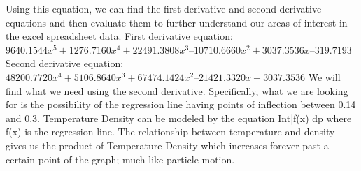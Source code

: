 \documentclass{article}
\begin{document}
Using this equation, we can find the first derivative and second derivative equations and then evaluate them to further understand our areas of interest in the excel spreadsheet data.
First derivative equation: $9640.1544x^5 + 1276.7160x^4 + 22491.3808x^3 – 10710.6660x^2 + 3037.3536x – 319.7193$
Second derivative equation: $48200.7720x^4 + 5106.8640x^3 + 67474.1424x^2 – 21421.3320x + 3037.3536$
We will find what we need using the second derivative. Specifically, what we are looking for is the possibility of the regression line having points of inflection between 0.14 and 0.3.
Temperature Density can be modeled by the equation Int|f(x) dp where f(x) is the regression line. The relationship between temperature and density gives us the product of Temperature Density which increases forever past a certain point of the graph; much like particle motion.
\end{document}

